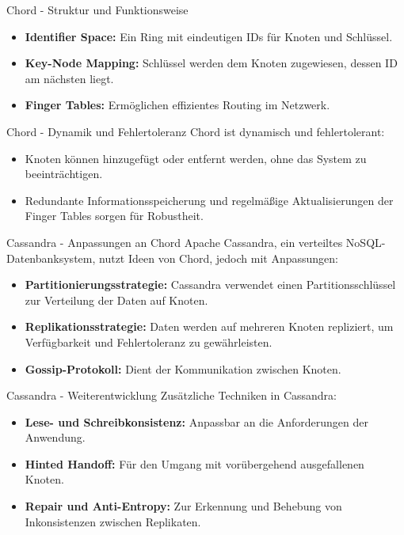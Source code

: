 \documentclass{beamer}
\begin{document}
\begin{frame}{Chord - Struktur und Funktionsweise}
    \begin{itemize}
        \item \textbf{Identifier Space:} Ein Ring mit eindeutigen IDs für Knoten und Schlüssel.
        \item \textbf{Key-Node Mapping:} Schlüssel werden dem Knoten zugewiesen, dessen ID am nächsten liegt.
        \item \textbf{Finger Tables:} Ermöglichen effizientes Routing im Netzwerk.
    \end{itemize}
\end{frame}

\begin{frame}{Chord - Dynamik und Fehlertoleranz}
    Chord ist dynamisch und fehlertolerant:
    \begin{itemize}
        \item Knoten können hinzugefügt oder entfernt werden, ohne das System zu beeinträchtigen.
        \item Redundante Informationsspeicherung und regelmäßige Aktualisierungen der Finger Tables sorgen für Robustheit.
    \end{itemize}
\end{frame}

\begin{frame}{Cassandra - Anpassungen an Chord}
    Apache Cassandra, ein verteiltes NoSQL-Datenbanksystem, nutzt Ideen von Chord, jedoch mit Anpassungen:
    \begin{itemize}
        \item \textbf{Partitionierungsstrategie:} Cassandra verwendet einen Partitionsschlüssel zur Verteilung der Daten auf Knoten.
        \item \textbf{Replikationsstrategie:} Daten werden auf mehreren Knoten repliziert, um Verfügbarkeit und Fehlertoleranz zu gewährleisten.
        \item \textbf{Gossip-Protokoll:} Dient der Kommunikation zwischen Knoten.
    \end{itemize}
\end{frame}

\begin{frame}{Cassandra - Weiterentwicklung}
    Zusätzliche Techniken in Cassandra:
    \begin{itemize}
        \item \textbf{Lese- und Schreibkonsistenz:} Anpassbar an die Anforderungen der Anwendung.
        \item \textbf{Hinted Handoff:} Für den Umgang mit vorübergehend ausgefallenen Knoten.
        \item \textbf{Repair und Anti-Entropy:} Zur Erkennung und Behebung von Inkonsistenzen zwischen Replikaten.
    \end{itemize}
\end{frame}
\end{document}
